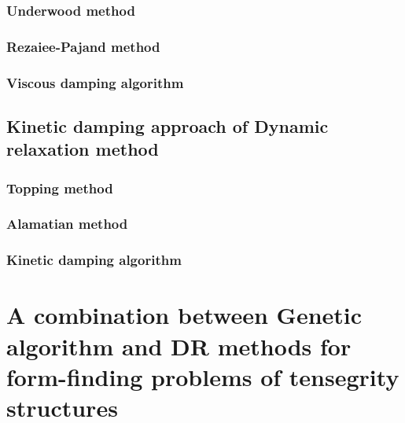 \documentclass[preprint,3p,12pt]{elsarticle}
\begin{document}
\subsubsection{Underwood method}
\subsubsection{Rezaiee-Pajand method}
\subsubsection{Viscous damping algorithm} 

\subsection{Kinetic damping approach of Dynamic relaxation method} \label{subsec:2:3}

\subsubsection{Topping method}

\subsubsection{Alamatian method}

\subsubsection{Kinetic damping algorithm}

\section{A combination between Genetic algorithm and DR methods for form-finding problems of tensegrity structures}
\label{sec:3}
\end{document}
